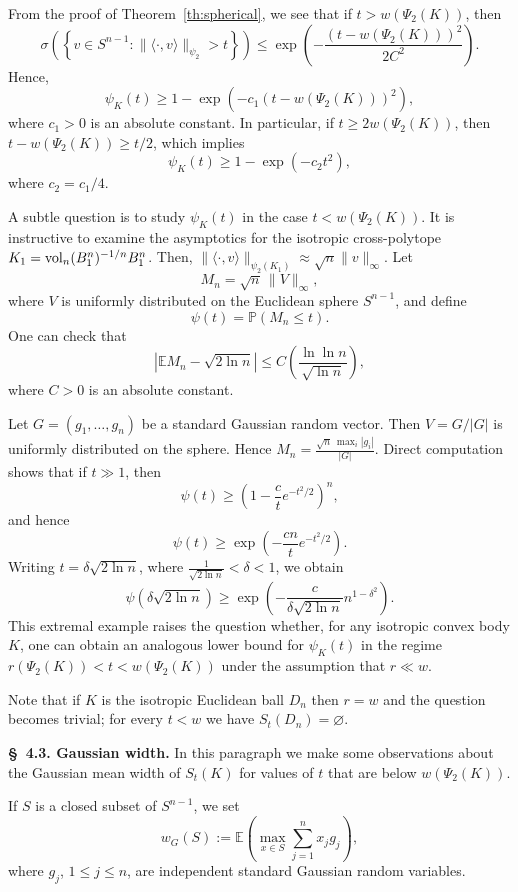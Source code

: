 \documentclass[11pt,leqno]{article}
\theoremstyle{definition}
\numberwithin{equation}{section}
\newcommand{\ls}{\leqslant}
\newcommand{\gr}{\geqslant}
\begin{document}
From the proof of Theorem~\ref{th:spherical}, we see that if $t>w(\Psi_2(K))$, then
\begin{equation*}\sigma\left(\left\{v\in S^{n-1}:\|\langle\cdot,v\rangle\|_{\psi_2}>t\right\}\right)
\ls\exp\left(-\frac{(t-w(\Psi_2(K)))^2}{2C^2}\right).\end{equation*}
Hence,
$$\psi_K(t)\gr 1-\exp\left(-c_1(t-w(\Psi_2(K)))^2\right),$$
where $c_1>0$ is an absolute constant. In particular, if $t\gr  2w(\Psi_2(K))$, then $t-w(\Psi_2(K))\gr t/2$, which implies
$$\psi_K(t)\gr 1-\exp(-c_2t^2),$$
where $c_2=c_1/4$.

A subtle question is to study $\psi_K(t)$ in the case $t<w(\Psi_2(K))$. It is instructive to examine the asymptotics for the isotropic cross-polytope
$K_1={\rm vol}_n(B_1^n)^{-1/n}B_1^n$. Then, $\|\langle\cdot,v\rangle\|_{\psi_2(K_1)}\approx\sqrt{n}\|v\|_{\infty}$.  
Let
$$M_n=\sqrt{n}\,\|V\|_\infty,$$
where $V$ is uniformly distributed on the Euclidean sphere $S^{n-1}$, and define
$$\psi(t)=\mathbb{P}(M_n\ls  t).$$
One can check that
$$\left|\mathbb{E}M_n-\sqrt{2\ln n}\right|\ls C\left(\frac{\ln\ln n}{\sqrt{\ln n}}\right),$$
where $C>0$ is an absolute constant.

Let $G=(g_1,\ldots,g_n)$ be a standard Gaussian random vector. Then $V=G/|G|$ is uniformly distributed on the sphere. Hence
$M_n=\frac{\sqrt{n}\,\max_i|g_i|}{|G|}$. Direct computation shows that if $t\gg 1$, then
$$\psi(t)\gr\left(1-\frac{c}{t}e^{-t^2/2}\right)^n,$$
and hence
$$\psi(t)\gr \exp\left(-\frac{cn}{t}e^{-t^2/2}\right).$$
Writing $t=\delta\sqrt{2\ln n}$, where $\frac{1}{\sqrt{2\ln n}}<\delta<1$, we obtain
$$\psi(\delta\sqrt{2\ln n})\gr\exp\!\left(-\frac{c}{\delta\sqrt{2\ln n}}n^{1-\delta^2}\right).$$
This extremal example raises the question whether, for any isotropic convex body $K$, one can obtain an analogous lower bound for $\psi_K(t)$ 
in the regime $r(\Psi_2(K))<t<w(\Psi_2(K))$ under the assumption that $r\ll w$. 

Note that if $K$ is the isotropic Euclidean ball $D_n$ then $r=w$ and the question becomes trivial; for every $t<w$ we have $S_t(D_n)=\varnothing$.

\medskip


\noindent \textbf{\S~4.3. Gaussian width.} In this paragraph we make some observations about the Gaussian mean width of $S_t(K)$ for values of $t$ that are below $w(\Psi_2(K))$.

If $S$ is a closed subset of $S^{n-1}$, we set
$$w_G(S):=\mathbb{E}\left(\max_{x\in S}\sum_{j=1}^n x_jg_j\right),$$
where $g_j$, $1\ls  j\ls  n$, are independent standard Gaussian random variables.
\end{document}
